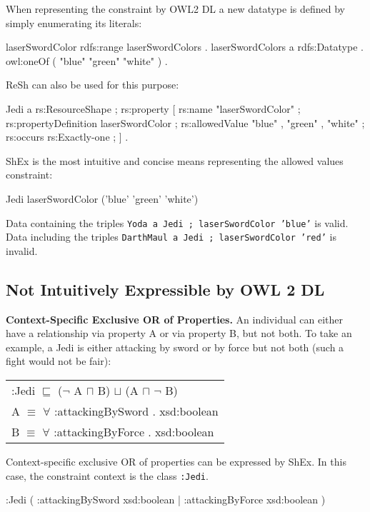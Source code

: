 \documentclass{llncs}
\newcommand{\ms}[1]{\texttt{#1}}
\newenvironment{DL}{
  \scriptsize
  \sffamily
  \vspace{0.3cm}
  \begin{tabular}{l}

}{
  \end{tabular}
  \linebreak
}
\begin{document}
When representing the constraint by OWL2 DL a new datatype is defined by simply enumerating its literals:

\begin{ex}
laserSwordColor rdfs:range laserSwordColors . 
laserSwordColors
    a rdfs:Datatype .
    owl:oneOf ( "blue" "green" "white" ) .
\end{ex}

ReSh can also be used for this purpose:

\begin{ex}
Jedi a rs:ResourceShape ;
    rs:property [
        rs:name "laserSwordColor" ;
        rs:propertyDefinition laserSwordColor ;
        rs:allowedValue "blue" , "green" , "white" ;
        rs:occurs rs:Exactly-one ;
    ] .
\end{ex}

ShEx is the most intuitive and concise means representing the allowed values constraint:

\begin{ex}
Jedi {
    laserSwordColor ('blue' 'green' 'white') }
\end{ex}

Data containing the triples \ms{Yoda a Jedi ; laserSwordColor 'blue'} is valid.
Data including the triples \ms{DarthMaul a Jedi ; laserSwordColor 'red'} is invalid.

\subsection{Not Intuitively Expressible by OWL 2 DL}

\textbf{Context-Specific Exclusive OR of Properties.}
An individual can either have a relationship via property A or via property B, but not both.
To take an example, a Jedi is either attacking by sword or by force but not both (such a fight would not be fair):

\begin{DL}
:Jedi $\sqsubseteq$ ($\neg$ A $\sqcap$ B) $\sqcup$ (A $\sqcap$ $\neg$ B) \\
A $\equiv$ $\forall$ :attackingBySword . xsd:boolean \\
B $\equiv$ $\forall$ :attackingByForce . xsd:boolean \\ 
\end{DL}

Context-specific exclusive OR of properties can be expressed by ShEx. 
In this case, the constraint context is the class \ms{:Jedi}.

\begin{ex}
:Jedi { (  
    :attackingBySword xsd:boolean | 
    :attackingByForce xsd:boolean ) }
\end{ex}
\end{document}
